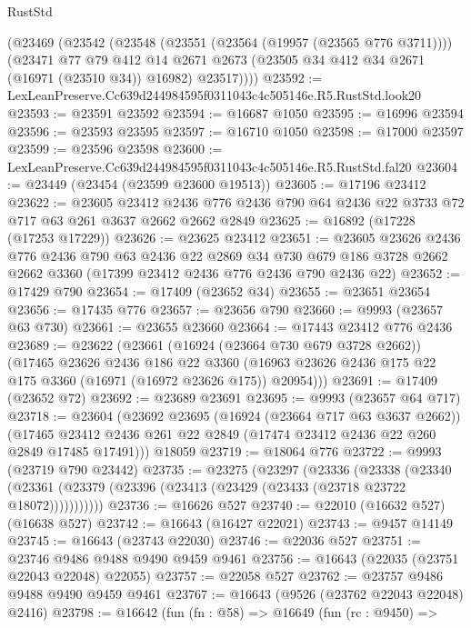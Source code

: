 \begin{lexlean}{RustStd}
\begin{coremodule}
    (@23469
      (@23542
        (@23548
          (@23551 (@23564 (@19957 (@23565 @776 @3711))))
          (@23471
            @77
            @79
            @412
            @14
            @2671
            @2673
            (@23505 @34 @412 @34 @2671 (@16971 (@23510 @34)) @16982)
            @23517))))
@23592 := LexLeanPreserve.Cc639d244984595f0311043c4c505146e.R5.RustStd.look20
@23593 := @23591 @23592
@23594 := @16687 @1050
@23595 := @16996 @23594
@23596 := @23593 @23595
@23597 := @16710 @1050
@23598 := @17000 @23597
@23599 := @23596 @23598
@23600 := LexLeanPreserve.Cc639d244984595f0311043c4c505146e.R5.RustStd.fal20
@23604 := @23449 (@23454 (@23599 @23600 @19513))
@23605 := @17196 @23412
@23622 := @23605
    @23412
    @2436
    @776
    @2436
    @790
    @64
    @2436
    @22
    @3733
    @72
    @717
    @63
    @261
    @3637
    @2662
    @2662
    @2849
@23625 := @16892 (@17228 (@17253 @17229))
@23626 := @23625 @23412
@23651 := @23605
    @23626
    @2436
    @776
    @2436
    @790
    @63
    @2436
    @22
    @2869
    @34
    @730
    @679
    @186
    @3728
    @2662
    @2662
    @3360
    (@17399 @23412 @2436 @776 @2436 @790 @2436 @22)
@23652 := @17429 @790
@23654 := @17409 (@23652 @34)
@23655 := @23651 @23654
@23656 := @17435 @776
@23657 := @23656 @790
@23660 := @9993 (@23657 @63 @730)
@23661 := @23655 @23660
@23664 := @17443 @23412 @776 @2436
@23689 := @23622
    (@23661
      (@16924 (@23664 @730 @679 @3728 @2662))
      (@17465
        @23626
        @2436
        @186
        @22
        @3360
        (@16963 @23626 @2436 @175 @22 @175 @3360 (@16971 (@16972 @23626 @175)) @20954)))
@23691 := @17409 (@23652 @72)
@23692 := @23689 @23691
@23695 := @9993 (@23657 @64 @717)
@23718 := @23604
    (@23692
      @23695
      (@16924 (@23664 @717 @63 @3637 @2662))
      (@17465 @23412 @2436 @261 @22 @2849 (@17474 @23412 @2436 @22 @260 @2849 @17485 @17491)))
    @18059
@23719 := @18064 @776
@23722 := @9993 (@23719 @790 @23442)
@23735 := @23275
    (@23297
      (@23336
        (@23338
          (@23340 (@23361 (@23379 (@23396 (@23413 (@23429 (@23433 (@23718 @23722 @18072)))))))))))
@23736 := @16626 @527
@23740 := @22010 (@16632 @527) (@16638 @527)
@23742 := @16643 (@16427 @22021)
@23743 := @9457 @14149
@23745 := @16643 (@23743 @22030)
@23746 := @22036 @527
@23751 := @23746 @9486 @9488 @9490 @9459 @9461
@23756 := @16643 (@22035 (@23751 @22043 @22048) @22055)
@23757 := @22058 @527
@23762 := @23757 @9486 @9488 @9490 @9459 @9461
@23767 := @16643 (@9526 (@23762 @22043 @22048) @2416)
@23798 := @16642
    (fun (fn : @58) =>
    @16649
      (fun (rc : @9450) =>

\end{coremodule}
\end{lexlean}

